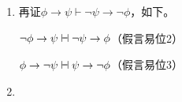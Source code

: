 \documentclass[punct=custom/kaiming,fontset=none]{ctexart}
\makeatletter
\newcommand*{\vdashv}{\mathrel{\ooalign{$\vdash$\cr\hskip1pt\reflectbox{$\vdash$}}}}
\renewenvironment{proof}[1][\proofname]{\par
  \pushQED{\qed}%
  \normalfont \topsep6\p@\@plus6\p@\relax
  \trivlist
  \item[\hskip\labelsep
    \bfseries
    #1%
    ]\ignorespaces
}{%
  \popQED\endtrivlist\@endpefalse
}
\let\proves\vdash
\makeatother
\begin{document}
\begin{description}
\begin{enumerate}
\begin{proof}
      \begin{ND}
        \label{1}
        \label{2}
      \end{ND}
      再证\(\phi \to \psi \proves \neg\psi \to \neg\phi\)，如下。
      \begin{ND}
        \ndl{}{}{}
      \end{ND}
    \end{proof}
    \(\neg\phi \to \psi \vdashv \neg\psi \to \phi\)\hfill（假言易位2）

    \(\phi \to \neg\psi \vdashv \psi \to \neg\phi\)\hfill（假言易位3）
  \item 
  \end{enumerate}
\end{description}
\end{document}

